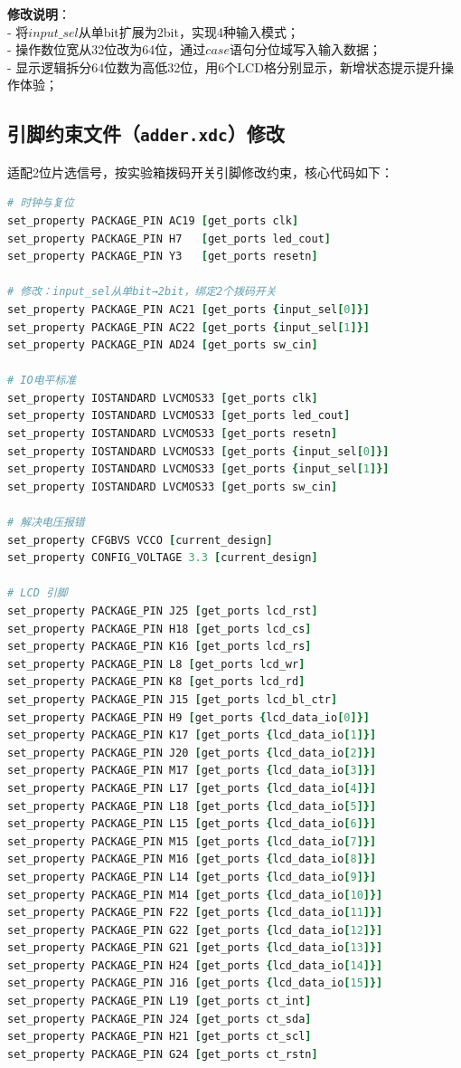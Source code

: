 \documentclass[12pt,a4paper,UTF8]{ctexart}
\begin{document}
\textbf{修改说明}： \\
- 将\(input\_sel\)从单bit扩展为2bit，实现4种输入模式； \\
- 操作数位宽从32位改为64位，通过\(case\)语句分位域写入输入数据； \\
- 显示逻辑拆分64位数为高低32位，用6个LCD格分别显示，新增状态提示提升操作体验； \\

\subsection{引脚约束文件（\texttt{adder.xdc}）修改}
适配2位片选信号，按实验箱拨码开关引脚修改约束，核心代码如下：
\begin{lstlisting}[language=Tcl]
# 时钟与复位
set_property PACKAGE_PIN AC19 [get_ports clk]
set_property PACKAGE_PIN H7   [get_ports led_cout]
set_property PACKAGE_PIN Y3   [get_ports resetn]

# 修改：input_sel从单bit→2bit，绑定2个拨码开关
set_property PACKAGE_PIN AC21 [get_ports {input_sel[0]}]
set_property PACKAGE_PIN AC22 [get_ports {input_sel[1]}]
set_property PACKAGE_PIN AD24 [get_ports sw_cin]

# IO电平标准
set_property IOSTANDARD LVCMOS33 [get_ports clk]
set_property IOSTANDARD LVCMOS33 [get_ports led_cout]
set_property IOSTANDARD LVCMOS33 [get_ports resetn]
set_property IOSTANDARD LVCMOS33 [get_ports {input_sel[0]}]
set_property IOSTANDARD LVCMOS33 [get_ports {input_sel[1]}]
set_property IOSTANDARD LVCMOS33 [get_ports sw_cin]

# 解决电压报错
set_property CFGBVS VCCO [current_design]
set_property CONFIG_VOLTAGE 3.3 [current_design]

# LCD 引脚
set_property PACKAGE_PIN J25 [get_ports lcd_rst]
set_property PACKAGE_PIN H18 [get_ports lcd_cs]
set_property PACKAGE_PIN K16 [get_ports lcd_rs]
set_property PACKAGE_PIN L8 [get_ports lcd_wr]
set_property PACKAGE_PIN K8 [get_ports lcd_rd]
set_property PACKAGE_PIN J15 [get_ports lcd_bl_ctr]
set_property PACKAGE_PIN H9 [get_ports {lcd_data_io[0]}]
set_property PACKAGE_PIN K17 [get_ports {lcd_data_io[1]}]
set_property PACKAGE_PIN J20 [get_ports {lcd_data_io[2]}]
set_property PACKAGE_PIN M17 [get_ports {lcd_data_io[3]}]
set_property PACKAGE_PIN L17 [get_ports {lcd_data_io[4]}]
set_property PACKAGE_PIN L18 [get_ports {lcd_data_io[5]}]
set_property PACKAGE_PIN L15 [get_ports {lcd_data_io[6]}]
set_property PACKAGE_PIN M15 [get_ports {lcd_data_io[7]}]
set_property PACKAGE_PIN M16 [get_ports {lcd_data_io[8]}]
set_property PACKAGE_PIN L14 [get_ports {lcd_data_io[9]}]
set_property PACKAGE_PIN M14 [get_ports {lcd_data_io[10]}]
set_property PACKAGE_PIN F22 [get_ports {lcd_data_io[11]}]
set_property PACKAGE_PIN G22 [get_ports {lcd_data_io[12]}]
set_property PACKAGE_PIN G21 [get_ports {lcd_data_io[13]}]
set_property PACKAGE_PIN H24 [get_ports {lcd_data_io[14]}]
set_property PACKAGE_PIN J16 [get_ports {lcd_data_io[15]}]
set_property PACKAGE_PIN L19 [get_ports ct_int]
set_property PACKAGE_PIN J24 [get_ports ct_sda]
set_property PACKAGE_PIN H21 [get_ports ct_scl]
set_property PACKAGE_PIN G24 [get_ports ct_rstn]


\end{lstlisting}
\end{document}

